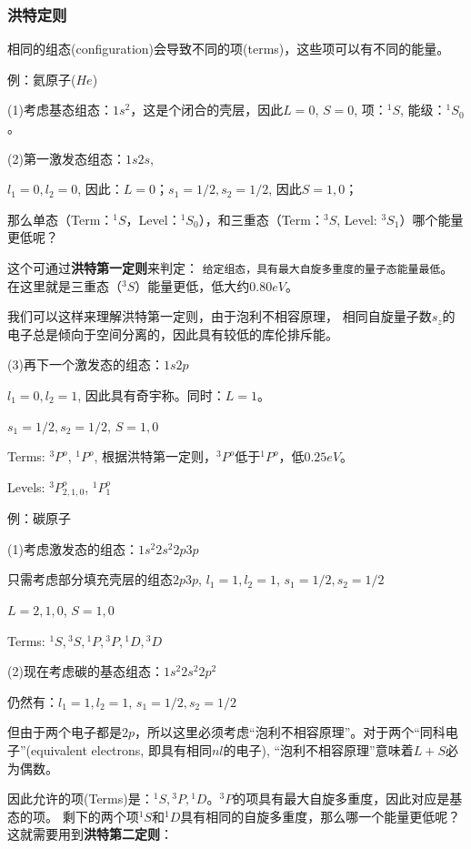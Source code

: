 \subsubsection{洪特定则}

相同的组态(configuration)会导致不同的项(terms)，这些项可以有不同的能量。

例：氦原子($He$)

(1)考虑基态组态：$1s^2$，这是个闭合的壳层，因此$L=0$, $S=0$,
项：$^1S$, 能级：$^1S_0$。

(2)第一激发态组态：$1s2s$,

$l_1=0, l_2=0$, 因此：$L=0$；$s_1=1/2, s_2=1/2$, 因此$S=1,0$；

那么单态（Term：$^1S$，Level：$^1S_0$），和三重态（Term：$^3S$,
Level: $^3S_1$）哪个能量更低呢？

这个可通过\textbf{洪特第一定则}来判定：
\texttt{给定组态，具有最大自旋多重度的量子态能量最低}。
在这里就是三重态（$^3S$）能量更低，低大约$0.80eV$。

我们可以这样来理解洪特第一定则，由于泡利不相容原理，
相同自旋量子数$s_z$的电子总是倾向于空间分离的，因此具有较低的库伦排斥能。

(3)再下一个激发态的组态：$1s2p$

$l_1=0, l_2=1$, 因此具有奇宇称。同时：$L=1$。

$s_1=1/2, s_2=1/2$, $S=1, 0$

Terms: $^3P^{o}$, $^1P^{o}$,
根据洪特第一定则，$^3P^{o}$低于$^1P^{o}$，低$0.25eV$。

Levels: $^3P^{o}_{2,1,0}$, $^1P^{o}_1$


例：碳原子


(1)考虑激发态的组态：$1s^2 2s^2 2p 3p$

只需考虑部分填充壳层的组态$2p 3p$, $l_1 = 1, l_2 = 1$, $s_1=1/2,
s_2=1/2$

$L=2,1,0$, $S=1,0$

Terms: ${}^1S, {}^3S, {}^1P, {}^3P, {}^1D, {}^3D$

(2)现在考虑碳的基态组态：$1s^2 2s^2 2p^2$

仍然有：$l_1 = 1, l_2 = 1$, $s_1=1/2, s_2=1/2$


但由于两个电子都是$2p$，所以这里必须考虑“泡利不相容原理”。对于两个``同科电子''(equivalent
electrons, 即具有相同$nl$的电子),
“泡利不相容原理”意味着$L+S$必为偶数。

因此允许的项(Terms)是：${}^1S, {}^3P,
{}^1D$。${}^3P$的项具有最大自旋多重度，因此对应是基态的项。
剩下的两个项${}^1S$和${}^1D$具有相同的自旋多重度，那么哪一个能量更低呢？
这就需要用到\textbf{洪特第二定则}：

